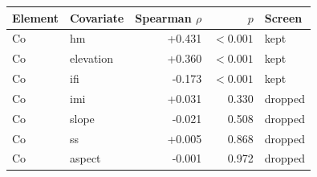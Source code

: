 \begin{tabular}{llrrl}
\hline
Element & Covariate & Spearman $\rho$ & $p$ & Screen \\
\hline
Co & hm & +0.431 & $<0.001$ & kept \\
Co & elevation & +0.360 & $<0.001$ & kept \\
Co & ifi & -0.173 & $<0.001$ & kept \\
Co & imi & +0.031 & 0.330 & dropped \\
Co & slope & -0.021 & 0.508 & dropped \\
Co & ss & +0.005 & 0.868 & dropped \\
Co & aspect & -0.001 & 0.972 & dropped \\
\hline
\end{tabular}

